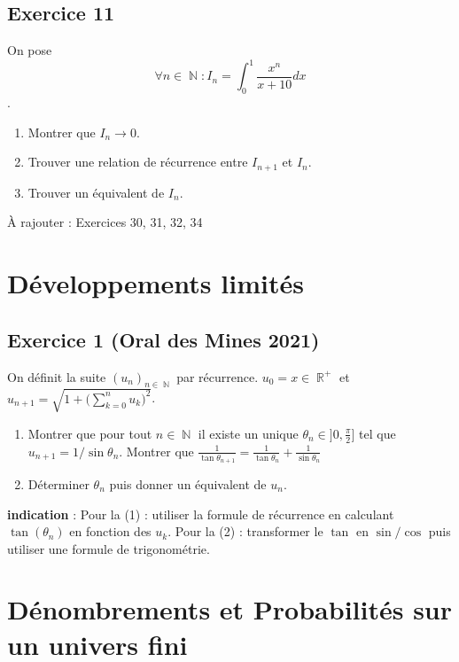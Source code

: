 \documentclass{article}
\DeclareMathOperator{\R}{\mathbb{R}}
\DeclareMathOperator{\N}{\mathbb{N}}
\begin{document}
\subsection*{Exercice 11} 

On pose $$\forall n\in \N : I_n = \int_0^1{\frac{x^n}{x+10}dx}$$.

\begin{enumerate}
    \item Montrer que $I_n \longrightarrow 0$. 
    \item Trouver une relation de récurrence entre $I_{n+1}$ et $I_n$. 
    \item Trouver un équivalent de $I_n$. 
\end{enumerate}

À rajouter : Exercices 30, 31, 32, 34 

\clearpage

\section{Développements limités} 

\subsection*{Exercice 1 (Oral des Mines 2021)} 

On définit la suite $(u_n)_{n\in \N}$ par récurrence. $u_0 = x \in \R^+$ et $u_{n+1} = \displaystyle\sqrt{1 + \Bigg(\sum_{k=0}^n{u_k}\Bigg)^2}$. 

\begin{enumerate}{}
    \item Montrer que pour tout $n\in \N$ il existe un unique $\theta_n \in ]0, \displaystyle\frac{\pi}{2}]$ tel que $u_{n+1} = 1/\sin{\theta_n}$. Montrer que $\displaystyle \frac{1}{\tan{\theta_{n+1}}} = \frac{1}{\tan{\theta_n}} + \frac{1}{\sin{\theta_n}}$ 
    \item Déterminer $\theta_n$ puis donner un équivalent de $u_n$. 
\end{enumerate}

\textbf{indication} : Pour la (1) : utiliser la formule de récurrence en calculant $\tan(\theta_n)$ en fonction des $u_k$. Pour la (2) : transformer le $\tan$ en $\sin/\cos$ puis utiliser une formule de trigonométrie.  

\clearpage

\section{Dénombrements et Probabilités sur un univers fini} 
\end{document}
